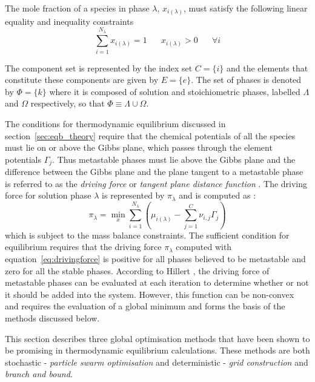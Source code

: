	\begin{constraint}
		The mole fraction of a species in phase $\lambda$, $x_{i(\lambda)}$, must satisfy the following linear equality and inequality constraints
		\begin{equation}
		\sum_{i=1}^{N_\lambda} x_{i(\lambda)} = 1 \mspace{30mu}x_{i(\lambda)} > 0\mspace{30mu} \forall i
		\end{equation}
	\end{constraint}
	
The component set is represented by the index set $C = \{i\}$ and the elements that constitute these components are given by $E  = \{e\}$. The set of phases is denoted by $\Phi = \{k\}$ where it is composed of solution and stoichiometric phases, labelled $\Lambda$ and $\Omega$ respectively, so that $\Phi \equiv \Lambda\cup \Omega$. 
	
	The conditions for thermodynamic equilibrium discussed in section~\ref{sec:eqb_theory} require that the chemical potentials of all the species must lie on or above the Gibbs plane, which passes through the element potentials $\Gamma_j$. Thus metastable phases must lie above the Gibbs plane and the difference between the Gibbs plane and the plane tangent to a metastable phase is referred to as the \emph{driving force} \cite{Lukas07} or \emph{tangent plane distance function} \cite{Lukas07,Zhang11}. The driving force for solution phase $\lambda$ is represented by $\pi_\lambda$ and is computed as \cite{Piro16}:
	\begin{equation}\label{eq:drivingforce}
		\pi_\lambda = \min_x \sum_{i=1}^{N_\lambda} \left(\mu_{i(\lambda)} - \sum_{j=1}^{C} \nu_{i,j}\Gamma_j \right)
	\end{equation}
	which is subject to the mass balance constraints. The sufficient condition for equilibrium requires that the driving force $\pi_\lambda$ computed with equation~\eqref{eq:drivingforce} is positive for all phases believed to be metastable and zero for all the stable phases. According to Hillert \cite{Hillert81}, the driving force of metastable phases can be evaluated at each iteration to determine whether or not it should be added into the system. However, this function can be non-convex and requires the evaluation of a global minimum and forms the basis of the methods discussed below.
	
	This section describes three global optimisation methods that have been shown to be promising in thermodynamic  equilibrium calculations. These methods are both stochastic - \emph{particle swarm optimisation} and deterministic - \emph{grid construction} and \emph{branch and bound}.
		
